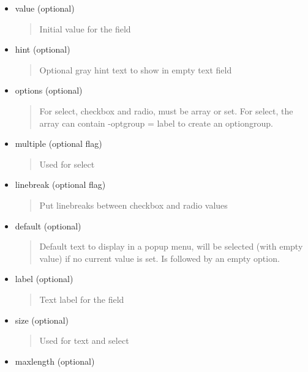 \documentclass[letterpaper,10pt,english]{sphinxmanual}
\begin{document}
\begin{fulllineitems}
\begin{fulllineitems}
\begin{description}
\begin{itemize}
\item {} 
value (optional)
\begin{quote}

Initial value for the field
\end{quote}

\item {} 
hint (optional)
\begin{quote}

Optional gray hint text to show in empty text field
\end{quote}

\item {} 
options (optional)
\begin{quote}

For select, checkbox and radio, must be array or set. For select,
the array can contain -optgroup = label to create an optiongroup.
\end{quote}

\item {} 
multiple (optional flag)
\begin{quote}

Used for select
\end{quote}

\item {} 
linebreak (optional flag)
\begin{quote}

Put linebreaks between checkbox and radio values
\end{quote}

\item {} 
default (optional)
\begin{quote}

Default text to display in a popup menu, will be selected (with
empty value) if no current value is set. Is followed by an empty
option.
\end{quote}

\item {} 
label (optional)
\begin{quote}

Text label for the field
\end{quote}

\item {} 
size (optional)
\begin{quote}

Used for text and select
\end{quote}

\item {} 
maxlength (optional)
\begin{quote}


\end{quote}
\end{itemize}
\end{description}
\end{fulllineitems}
\end{fulllineitems}
\end{document}
